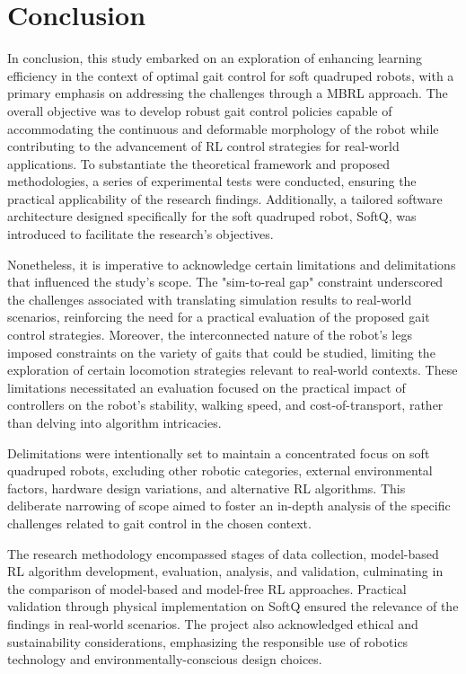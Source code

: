 \section{Conclusion}
In conclusion, this study embarked on an exploration of enhancing learning efficiency in the context of optimal gait control for soft quadruped robots, with a primary emphasis on addressing the challenges through a MBRL approach. The overall objective was to develop robust gait control policies capable of accommodating the continuous and deformable morphology of the robot while contributing to the advancement of RL control strategies for real-world applications. To substantiate the theoretical framework and proposed methodologies, a series of experimental tests were conducted, ensuring the practical applicability of the research findings. Additionally, a tailored software architecture designed specifically for the soft quadruped robot, SoftQ, was introduced to facilitate the research's objectives.

Nonetheless, it is imperative to acknowledge certain limitations and delimitations that influenced the study's scope. The "sim-to-real gap" constraint underscored the challenges associated with translating simulation results to real-world scenarios, reinforcing the need for a practical evaluation of the proposed gait control strategies. Moreover, the interconnected nature of the robot's legs imposed constraints on the variety of gaits that could be studied, limiting the exploration of certain locomotion strategies relevant to real-world contexts. These limitations necessitated an evaluation focused on the practical impact of controllers on the robot's stability, walking speed, and cost-of-transport, rather than delving into algorithm intricacies.

Delimitations were intentionally set to maintain a concentrated focus on soft quadruped robots, excluding other robotic categories, external environmental factors, hardware design variations, and alternative RL algorithms. This deliberate narrowing of scope aimed to foster an in-depth analysis of the specific challenges related to gait control in the chosen context.

The research methodology encompassed stages of data collection, model-based RL algorithm development, evaluation, analysis, and validation, culminating in the comparison of model-based and model-free RL approaches. Practical validation through physical implementation on SoftQ ensured the relevance of the findings in real-world scenarios. The project also acknowledged ethical and sustainability considerations, emphasizing the responsible use of robotics technology and environmentally-conscious design choices.

